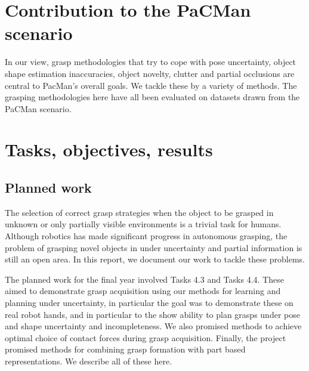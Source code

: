 \documentclass[a4paper,11pt,pdf]{pacmanreport}
\begin{document}
\section*{Contribution to the PaCMan scenario}

In our view, grasp methodologies that try to cope with pose uncertainty, object shape estimation inaccuracies, object novelty, clutter and partial occlusions are central to PacMan's overall goals. We tackle these by a variety of methods. The grasping methodologies here have all been evaluated on datasets drawn from the PaCMan scenario.

\newpage

\section{Tasks, objectives, results}

\subsection{Planned work}

The selection of correct grasp strategies when the object to be grasped in unknown or only partially visible environments is a trivial task for humans. Although robotics has made significant progress in autonomous grasping, the problem of grasping novel objects in under uncertainty and partial information is still an open area. In this report, we document our work to tackle these problems.

The planned work for the final year involved Tasks 4.3 and Tasks 4.4. These aimed to demonstrate grasp acquisition using our methods for learning and planning under uncertainty, in particular the goal was to demonstrate these on real robot hands, and in particular to the show ability to plan grasps under pose and shape uncertainty and incompleteness. We also promised methods to achieve optimal choice of contact forces during grasp acquisition.  Finally, the project promised methods for combining grasp formation with part based representations. We describe all of these here.

\end{document}
